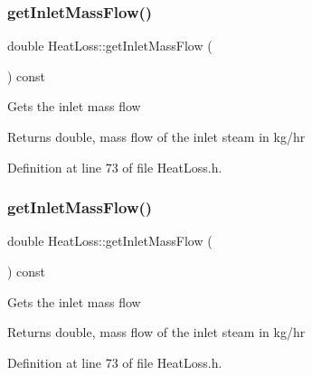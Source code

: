 \mbox{\label{class_heat_loss_ad11a428f99a4945628f66adecb88bf5a}} 
\subsubsection{\texorpdfstring{get\+Inlet\+Mass\+Flow()}{getInletMassFlow()}\hspace{0.1cm}{\footnotesize\ttfamily [1/3]}}
{\footnotesize\ttfamily double Heat\+Loss\+::get\+Inlet\+Mass\+Flow (\begin{DoxyParamCaption}{ }\end{DoxyParamCaption}) const\hspace{0.3cm}{\ttfamily [inline]}}

Gets the inlet mass flow \begin{DoxyReturn}{Returns}
double, mass flow of the inlet steam in kg/hr 
\end{DoxyReturn}


Definition at line 73 of file Heat\+Loss.\+h.

\mbox{\label{class_heat_loss_ad11a428f99a4945628f66adecb88bf5a}} 
\subsubsection{\texorpdfstring{get\+Inlet\+Mass\+Flow()}{getInletMassFlow()}\hspace{0.1cm}{\footnotesize\ttfamily [2/3]}}
{\footnotesize\ttfamily double Heat\+Loss\+::get\+Inlet\+Mass\+Flow (\begin{DoxyParamCaption}{ }\end{DoxyParamCaption}) const\hspace{0.3cm}{\ttfamily [inline]}}

Gets the inlet mass flow \begin{DoxyReturn}{Returns}
double, mass flow of the inlet steam in kg/hr 
\end{DoxyReturn}


Definition at line 73 of file Heat\+Loss.\+h.

\mbox{\label{class_heat_loss_ad11a428f99a4945628f66adecb88bf5a}} 
